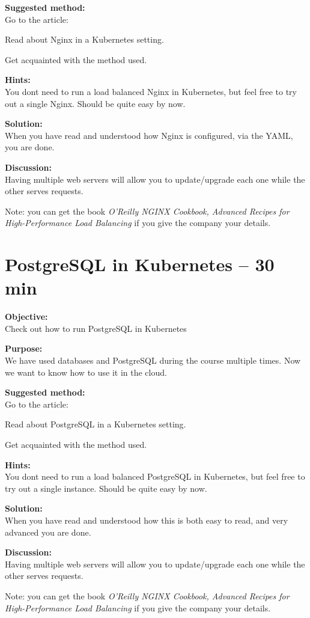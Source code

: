 \documentclass[a4paper,11pt,notitlepage]{report}
\begin{document}
{\bf Suggested method:}\\
Go to the article:\\

Read about Nginx in a Kubernetes setting.

Get acquainted with the method used.

{\bf Hints:}\\
You dont need to run a load balanced Nginx in Kubernetes, but feel free to try out a single Nginx. Should be quite easy by now.

{\bf Solution:}\\
When you have read and understood how Nginx is configured, via the YAML, you are done.

{\bf Discussion:}\\
Having multiple web servers will allow you to update/upgrade each one while the other serves requests.

Note: you can get the book \emph{O'Reilly NGINX Cookbook,
Advanced Recipes for High-Performance Load Balancing} if you give the company your details.





\chapter{PostgreSQL in Kubernetes -- 30 min}
\label{ex:k8s-postgrsql}


{\bf Objective:}\\
Check out how to run PostgreSQL in Kubernetes

{\bf Purpose:}\\
We have used databases and PostgreSQL during the course multiple times. Now we want to know how to use it in the cloud.

{\bf Suggested method:}\\
Go to the article:\\

Read about PostgreSQL in a Kubernetes setting.

Get acquainted with the method used.

{\bf Hints:}\\
You dont need to run a load balanced PostgreSQL in Kubernetes, but feel free to try out a single instance. Should be quite easy by now.

{\bf Solution:}\\
When you have read and understood how this is both easy to read, and very advanced you are done.

{\bf Discussion:}\\
Having multiple web servers will allow you to update/upgrade each one while the other serves requests.

Note: you can get the book \emph{O'Reilly NGINX Cookbook,
Advanced Recipes for High-Performance Load Balancing} if you give the company your details.
\end{document}
